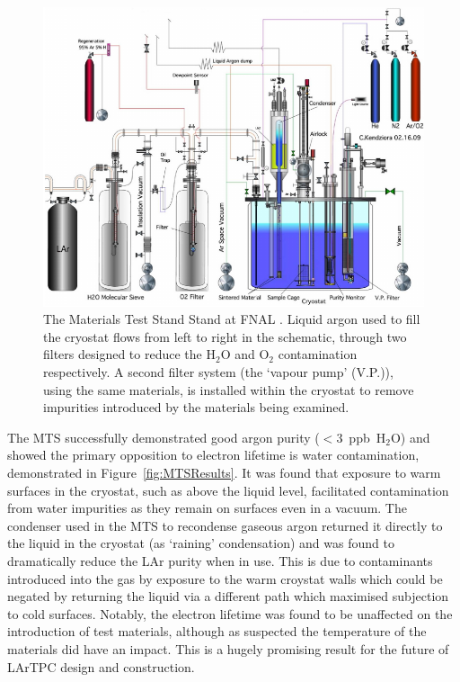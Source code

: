 \begin{figure}
  \centering
  \includegraphics[width=14cm]{MTS.pdf}
  \caption[The Materials Test Stand Stand at FNAL.]{The Materials Test Stand Stand at FNAL \cite{MTS2009b}.  Liquid argon used to fill the cryostat flows from left to right in the schematic, through two filters designed to reduce the H$_2$O and O$_2$ contamination respectively.  A second filter system (the `vapour pump' (V.P.)), using the same materials, is installed within the cryostat to remove impurities introduced by the materials being examined.}
  \label{fig:MTS}
\end{figure}

The MTS successfully demonstrated good argon purity ($<3$~ppb~H$_2$O) and showed the primary opposition to electron lifetime is water contamination, demonstrated in Figure~\ref{fig:MTSResults}.  It was found that exposure to warm surfaces in the cryostat, such as above the liquid level, facilitated contamination from water impurities as they remain on surfaces even in a vacuum.  The condenser used in the MTS to recondense gaseous argon returned it directly to the liquid in the cryostat (as `raining' condensation) and was found to dramatically reduce the LAr purity when in use.  This is due to contaminants introduced into the gas by exposure to the warm croystat walls which could be negated by returning the liquid via a different path which maximised subjection to cold surfaces.  Notably, the electron lifetime was found to be unaffected on the introduction of test materials, although as suspected the temperature of the materials did have an impact.  This is a hugely promising result for the future of LArTPC design and construction.


